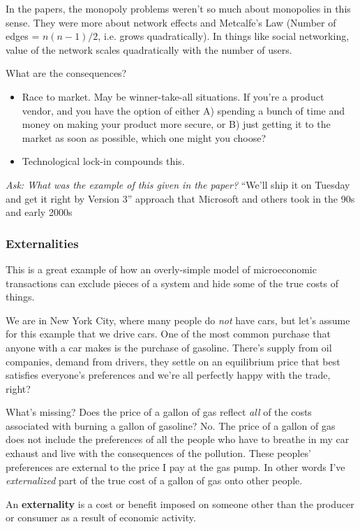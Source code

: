 \documentclass[11pt]{article}
\begin{document}
In the papers, the monopoly problems weren't so much about monopolies in this sense. They were more about network effects and Metcalfe's Law (Number of edges = $n(n-1)/2$, i.e. grows quadratically). In things like social networking, value of the network scales quadratically with the number of users.

What are the consequences? 
\begin{itemize}
    \item Race to market. May be winner-take-all situations. If you're a product vendor, and you have the option of either A) spending a bunch of time and money on making your product more secure, or B) just getting it to the market as soon as possible, which one might you choose?
    \item Technological lock-in compounds this.
\end{itemize}

{\it Ask: What was the example of this given in the paper?} ``We'll ship it on Tuesday and get it right by Version 3'' approach that Microsoft and others took in the 90s and early 2000s


\subsubsection{Externalities}

This is a great example of how an overly-simple model of microeconomic transactions can exclude pieces of a system and hide some of the true costs of things.

We are in New York City, where many people do {\it not} have cars, but let's assume for this example that we drive cars. One of the most common purchase that anyone with a car makes is the purchase of gasoline. There's supply from oil companies, demand from drivers, they settle on an equilibrium price that best satisfies everyone's preferences and we're all perfectly happy with the trade, right?

What's missing? Does the price of a gallon of gas reflect {\it all} of the costs associated with burning a gallon of gasoline?
No. The price of a gallon of gas does not include the preferences of all the people who have to breathe in my car exhaust and live with the consequences of the pollution. These peoples' preferences are external to the price I pay at the gas pump. In other words I've {\it externalized} part of the true cost of a gallon of gas onto other people.

An {\bf externality} is a cost or benefit imposed on someone other than the producer or consumer as a result of economic activity.
\end{document}
